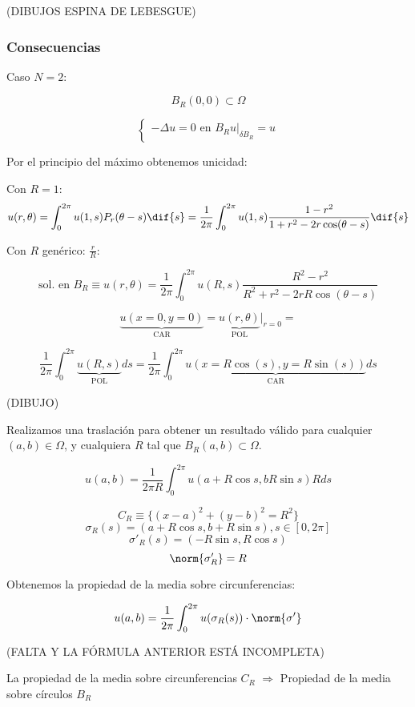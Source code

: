 	(DIBUJOS ESPINA DE LEBESGUE)

	\subsubsection{Consecuencias}


		Caso $N = 2$:

		\[ B_R (0,0) \subset \Omega \]

		\[\begin{cases}
			-\Delta u = 0 \text{ en } B_R
			u|_{\delta B_R} = u
		\end{cases}\]

		Por el principio del máximo obtenemos unicidad:

		Con $R = 1$: \[ u(r, \theta) = \int_{0}^{2\pi} u(1,s) P_r(\theta-s) \dif{s} = \frac{1}{2\pi} \int_0^{2\pi} u(1,s) \frac{1-r^2}{1+r^2 - 2r\cos(\theta-s)} \dif{s} \]

		Con $R$ genérico: $\frac{r}{R}$:

		\[ \text{sol. en }B_R \equiv u(r, \theta) = \frac{1}{2\pi} \int_0^{2\pi} u(R,s) \frac{R^2-r^2}{R^2+r^2-2rR \cos(\theta-s)} \]

		\[  \underbrace{u (x = 0, y=0)}_{\text{CAR}} = \underbrace{u(r, \theta)}_{\text{POL}} |_{r=0} = \]

		\[ \frac{1}{2\pi} \int_0^{2\pi} \underbrace{u(R,s)}_{\text{POL}} ds =  \frac{1}{2\pi} \int_0^{2\pi} \underbrace{u(x=R\cos(s),y=R\sin(s))}_{\text{CAR}} ds\]

		(DIBUJO)

		Realizamos una traslación para obtener un resultado válido para cualquier $(a,b) \in \Omega$, y cualquiera $R$ tal que $B_R(a,b) \subset \Omega$.

		\[ u(a,b) = \frac{1}{2\pi R} \int_0^{2\pi} u(a+R\cos s, b R \sin s) R ds \]

		\[ C_R \equiv \{ (x-a)^2 + (y-b)^2 = R^2\}\]
		\[ \sigma_R (s) = (a + R \cos s , b + R \sin s), s \in [0,2\pi]\]
		\[ \sigma'_R (s) = (-R \sin s, R \cos s)\]
		\[ \norm{\sigma'_R} = R\]

		Obtenemos la propiedad de la media sobre circunferencias:

		\[ u(a,b) = \frac{1}{2\pi} \int_0^{2\pi} u(\sigma_R (s)) \cdot \norm{\sigma'} \]

		(FALTA Y LA FÓRMULA ANTERIOR ESTÁ INCOMPLETA)

		\obs La propiedad de la media sobre circunferencias $C_R$ $\Rightarrow$ Propiedad de la media sobre círculos $B_R$


